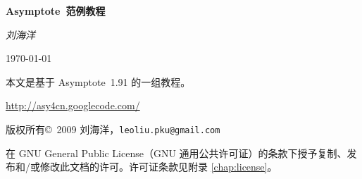 \documentclass[cs4size,oneside,openany,nofonts,UTF8,CJKnormalspaces]
  {ctexbook}[2009/05/20]
\newcommand*\Asy{\textsf{Asymptote}}
\newcommand*\asyversion{1.91}
\begin{document}
\frontmatter

\begin{titlepage}
\begin{center}
  {\bfseries
  \Asy\ 范例教程}
\bigskip

  {\rmfamily\itshape
  刘海洋}
\bigskip

  {\today}
\end{center}
\end{titlepage}

\begingroup
\setlength{\parindent}{0pt}
本文是基于 \Asy\ \asyversion{} 的一组教程。

\url{http://asy4cn.googlecode.com/}
\medskip

版权所有\copyright\ 2009 刘海洋，\nolinkurl{leoliu.pku@gmail.com}

{\setlength{\leftskip}{2em}
在 GNU General Public License（GNU 通用公共许可证）的条款下授予复制、发布和/或修改此文档的许可。许可证条款见附录 \ref{chap:license}。\par}
\endgroup
\newpage

\tableofcontents

\mainmatter





\appendix


\printindex



\end{document}

